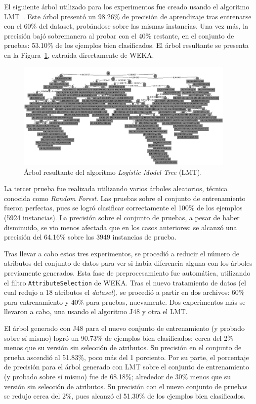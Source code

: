 \documentclass{llncs}
\begin{document}
El siguiente árbol utilizado para los experimentos fue creado usando el algoritmo LMT~\cite{Landwehr2005}.
Este árbol presentó un 98.26\% de precisión de aprendizaje tras entrenarse con el 60\% del dataset, probándose sobre las mismas instancias.
Una vez más, la precisión bajó sobremanera al probar con el 40\% restante, en el conjunto de pruebas:
53.10\% de los ejemplos bien clasificados.
El árbol resultante se presenta en la Figura~\ref{fig:lmt}, extraída directamente de WEKA.

\begin{figure}[htbp]
	\centering
	\includegraphics[width=0.95\textwidth]{05-lmt}
	\caption{Árbol resultante del algoritmo \textit{Logistic Model Tree} (LMT).}
	\label{fig:lmt}
\end{figure}

La tercer prueba fue realizada utilizando varios árboles aleatorios, técnica conocida como \textit{Random Forest}.
Las pruebas sobre el conjunto de entrenamiento fueron perfectas,
pues se logró clasificar correctamente el 100\% de los ejemplos (5924 instancias).
La precisión sobre el conjunto de pruebas, a pesar de haber disminuido,
se vio menos afectada que en los casos anteriores:
se alcanzó una precisión del 64.16\% sobre las 3949 instancias de prueba.

Tras llevar a cabo estos tres experimentos, se procedió a reducir el número de atributos del conjunto de datos para ver si había diferencia alguna con los árboles previamente generados.
Esta fase de preprocesamiento fue automática, utilizando el filtro \texttt{AttributeSelection} de WEKA.
Tras el nuevo tratamiento de datos (el cual redujo a 18 atributos el \textit{dataset}),
se procedió a partir en dos archivos: 60\% para entrenamiento y 40\% para pruebas, nuevamente.
Dos experimentos más se llevaron a cabo, una usando el algoritmo J48 y otra el LMT.

El árbol generado con J48 para el nuevo conjunto de entrenamiento (y probado sobre sí mismo)
logró un 90.73\% de ejemplos bien clasificados; cerca del 2\% menos que su versión sin selección de atributos.
Su precisión en el conjunto de prueba ascendió al 51.83\%, poco más del 1 porciento.
Por su parte, el porcentaje de precisión para el árbol generado con LMT sobre el conjunto de entrenamiento (y probado sobre sí mismo)
fue de 68.18\%; alrededor de 30\% menos que su versión sin selección de atributos.
Su precisión con el nuevo conjunto de pruebas se redujo cerca del 2\%,
pues alcanzó el 51.30\% de los ejemplos bien clasificados.
\end{document}
